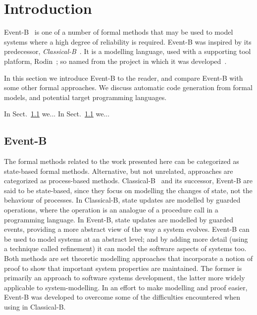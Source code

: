 \section{Introduction}
Event-B~\cite{ABR10} is one of a number of formal methods that may be used to model systems where a high degree of reliability is required. Event-B was inspired by its predecessor, \emph{Classical-B}~\cite{TheBBook}. It is a modelling language, used with a supporting tool platform, Rodin~\cite{abrial10rodin}; so named from the project in which it was developed~\cite{RodinTool}.  

In this section we introduce Event-B to the reader, and compare Event-B with some other formal approaches. We discuss automatic code generation from formal models, and potential target programming languages.

In Sect.~\ref{} we...
In Sect.~\ref{} we...

\subsection{Event-B}
The formal methods related to the work presented here can be categorized as state-based formal methods. Alternative, but not unrelated, approaches are categorized as process-based methods. Classical-B~\cite{TheBBook,CNP,CNPInterface,B4Free} and its successor, Event-B are said to be state-based, since they focus on modelling the changes of state, not the behaviour of processes. In Classical-B, state updates are modelled by guarded operations, where the operation is an analogue of a procedure call in a programming language. In Event-B, state updates are modelled by guarded events, providing a more abstract view of the way a system evolves. Event-B can be used to model systems at an abstract level; and by adding more detail (using a technique called refinement) it can model the software aspects of systems too. Both methods are set theoretic modelling approaches that incorporate a notion of proof to show that important system properties are maintained. The former is primarily an approach to software systems development, the latter more widely applicable to system-modelling. In an effort to make modelling and proof easier, Event-B was developed to overcome some of the difficulties encountered when using in Classical-B. 

